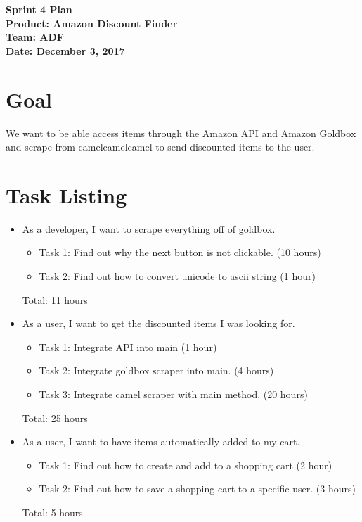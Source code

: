 \documentclass[11pt]{article}
\newcommand\tab[1][1cm]{\hspace*{#1}}
\begin{document}
	\Large{\textbf{Sprint 4 Plan}}\\
	\Large{\textbf{Product: Amazon Discount Finder}}\\
	\Large{\textbf{Team: ADF}}\\
	\Large{\textbf{Date: December 3, 2017}}\\
	
	\vspace{-3mm}
	
	\section{Goal}
		\vspace{-3mm}
		\tab \normalsize{We want to be able access items through the Amazon API and Amazon Goldbox and scrape} 
		\tab \normalsize{from camelcamelcamel to send discounted items to the user.}
		

	\section{Task Listing}
		\vspace{-3mm}
		\begin{itemize}
			\item As a developer, I want to scrape everything off of goldbox.
			\begin{itemize}
			    \item Task 1: Find out why the next button is not clickable. (10 hours) 
			    \item Task 2: Find out how to convert unicode to ascii string (1 hour)
			\end{itemize}
			Total: 11 hours
			\item As a user, I want to get the discounted items I was looking for.
			\begin{itemize}
			    \item Task 1: Integrate API into main (1 hour)
			    \item Task 2: Integrate goldbox scraper into main.  (4 hours)
			    \item Task 3: Integrate camel scraper with main method. (20 hours)
			\end{itemize}
			Total: 25 hours
			\item As a user, I want to have items automatically added to my cart.
			\begin{itemize}
			    \item Task 1: Find out how to create and add to a shopping cart (2 hour)
			    \item Task 2: Find out how to save a shopping cart to a specific user. (3 hours)
			\end{itemize}
			 Total: 5 hours
		\end{itemize}
		
\end{document}
